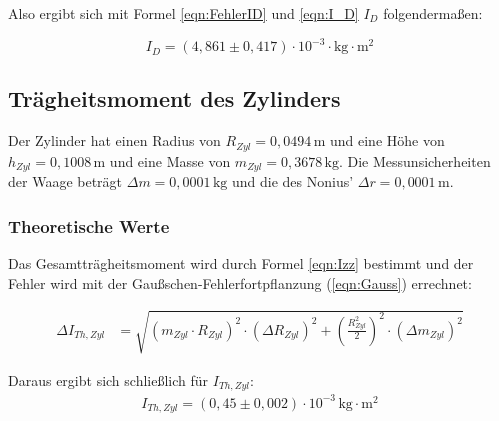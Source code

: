Also ergibt sich mit Formel \ref{eqn:FehlerID} und \ref{eqn:I_D} $I_D$ folgendermaßen:

\begin{equation}
  \label{Erg:ID}
  I_D = \left(4{,}861 \pm 0{,}417 \right)\cdot 10^{-3} \cdot \mathrm{kg \cdot m^2}
\end{equation}


\subsection{Trägheitsmoment des Zylinders}
\label{sec:TraegheitsmomentdesZylinders}
Der Zylinder hat einen Radius von $R_{Zyl} = 0{,}0494 \, \mathrm{m}$ und eine Höhe von $h_{Zyl} = 0{,}1008 \, \mathrm{m}$
und eine Masse von $m_{Zyl} = 0{,}3678 \, \mathrm{kg}$.
Die Messunsicherheiten der Waage beträgt $\Delta m = 0,0001\, \mathrm{kg}$ und die des Nonius' $\Delta r = 0,0001\, \mathrm{m}$.
\subsubsection{Theoretische Werte}
Das Gesamtträgheitsmoment wird durch Formel \ref{eqn:Izz} bestimmt und der Fehler wird mit der Gaußschen-Fehlerfortpflanzung (\ref{eqn:Gauss}) errechnet:

\begin{align}
  \label{eqn:FehlerIZ}
  \Delta I_{Th, Zyl} &= \sqrt{\left(m_{Zyl} \cdot R_{Zyl} \right)^2 \cdot (\Delta R_{Zyl})^2 + \left(\frac{R_{Zyl}^2}{2} \right)^2 \cdot (\Delta m_{Zyl})^2}
\end{align}

Daraus ergibt sich schließlich für $I_{Th, Zyl}$:
\begin{align*}
  I_{Th, Zyl} = \left(0{,}45 \pm 0{,}002 \right) \cdot 10^{-3} \, \mathrm{kg}\cdot\mathrm{m^2}
\end{align*}


